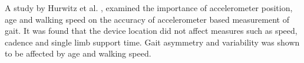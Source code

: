 A study by Hurwitz et al. \cite{Hurwitz2016}, examined the importance of accelerometer position, age and walking speed on the accuracy of accelerometer based measurement of gait. It was found that the device location did not affect measures such as speed, cadence and single limb support time. Gait asymmetry and variability was shown to be affected by age and walking speed. 















